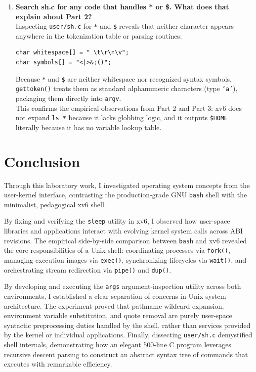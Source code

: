 \documentclass{labreport}
\begin{document}
\begin{enumerate}[leftmargin=*]
    \item \textbf{Search sh.c for any code that handles * or \$. What does that explain about Part 2?}\\[0.2em]
    Inspecting \texttt{user/sh.c} for \texttt{*} and \texttt{\$} reveals that neither character appears anywhere in the tokenization table or parsing routines:
\begin{lstlisting}[style=c]
char whitespace[] = " \t\r\n\v";
char symbols[] = "<|>&;()";
\end{lstlisting}
    Because \texttt{*} and \texttt{\$} are neither whitespace nor recognized syntax symbols, \texttt{gettoken()} treats them as standard alphanumeric characters (type \texttt{'a'}), packaging them directly into \texttt{argv}.\\
    This confirms the empirical observations from Part 2 and Part 3: xv6 does not expand \texttt{ls *} because it lacks globbing logic, and it outputs \texttt{\$HOME} literally because it has no variable lookup table.
\end{enumerate}

\section{Conclusion}

Through this laboratory work, I investigated operating system concepts from the user-kernel interface, contrasting the production-grade GNU \texttt{bash} shell with the minimalist, pedagogical xv6 shell.

By fixing and verifying the \texttt{sleep} utility in xv6, I observed how user-space libraries and applications interact with evolving kernel system calls across ABI revisions. The empirical side-by-side comparison between \texttt{bash} and xv6 revealed the core responsibilities of a Unix shell: coordinating processes via \texttt{fork()}, managing execution images via \texttt{exec()}, synchronizing lifecycles via \texttt{wait()}, and orchestrating stream redirection via \texttt{pipe()} and \texttt{dup()}. 

By developing and executing the \texttt{args} argument-inspection utility across both environments, I established a clear separation of concerns in Unix system architecture. The experiment proved that pathname wildcard expansion, environment variable substitution, and quote removal are purely user-space syntactic preprocessing duties handled by the shell, rather than services provided by the kernel or individual applications. Finally, dissecting \texttt{user/sh.c} demystified shell internals, demonstrating how an elegant 500-line C program leverages recursive descent parsing to construct an abstract syntax tree of commands that executes with remarkable efficiency.
\end{document}

